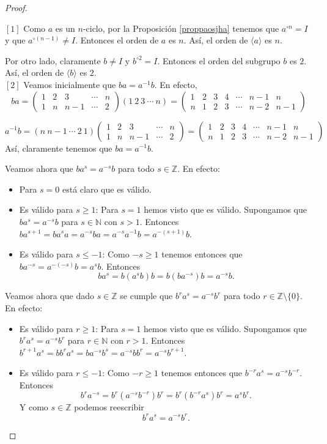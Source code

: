 \begin{proof}
	\textcolor{white}{text}
	
	\medskip
	\noindent $[1]$ Como $a$ es un $n$-ciclo, por la Proposición \ref{proppaosjha} tenemos que $a^{\circ n}=I$ y que $a^{\circ(n-1)}\neq I$. Entonces el orden de $a$ es $n$. Así, el orden de $\langle a\rangle$ es $n$. 
	
	\medskip
	\noindent Por otro lado, claramente $b\neq I$ y $b^{\circ 2}=I$. Entonces el orden del subgrupo  $b$ es $2$. Así, el orden de $\langle b\rangle$ es $2$.         \\
	
	\noindent $[2]$ Veamos inicialmente que $ba=a^{-1}b$. En efecto,  
	\[
	ba = \begin{pmatrix}
		1 & 2 & 3 & \cdots & n \\
		1 & n & n-1 & \cdots & 2
	\end{pmatrix}
	(1\ 2\ 3\ \cdots\ n) 
	= \begin{pmatrix}
		1 & 2 & 3 & 4 & \cdots & n-1 & n \\
		n & 1 & 2 & 3 & \cdots & n-2 & n-1
	\end{pmatrix}
	\]     
	
	\[
	a^{-1}b = (n\ n-1\ \cdots\ 2\ 1)\begin{pmatrix}
		1 & 2 & 3 & \cdots & n \\
		1 & n & n-1 & \cdots & 2
	\end{pmatrix} = \begin{pmatrix}
		1 & 2 & 3 & 4 & \cdots & n-1 & n \\
		n & 1 & 2 & 3 & \cdots & n-2 & n-1
	\end{pmatrix}
	\] Así, claramente tenemos que $ba=a^{-1}b$.
	
	\medskip
	\noindent Veamos ahora que $ba^{s}=a^{-s}b$ para todo $s\in \mathbb{Z}$. En efecto:
	\begin{itemize}
		\item Para $s=0$ está claro que es válido.
		\item Es válido para $s\geq 1$: Para $s=1$ hemos visto que es válido. Supongamos que $ba^s=a^{-s}b$ para $s\in \mathbb{N}$ con $s>1$. Entonces $ba^{s+1}=ba^sa=a^{-s}ba=a^{-s}a^{-1}b=a^{-(s+1)}b$.
		\item Es válido para $s\leq -1$: Como $-s\geq 1$ tenemos entonces que $ba^{-s}=a^{-(-s)}b=a^sb$. Entonces $$ba^s=b(a^sb)b=b(ba^{-s})b=a^{-s}b.$$
	\end{itemize}
	\noindent Veamos ahora que dado $s\in \mathbb{Z}$ se cumple que $b^ra^{s}=a^{-s}b^r$ para todo $r\in \mathbb{Z}\setminus\{0\}$. En efecto:
	\begin{itemize}
		\item Es válido para $r\geq 1$: Para $s=1$ hemos visto que es válido. Supongamos que $b^ra^s=a^{-s}b^r$ para $r\in \mathbb{N}$ con $r>1$. Entonces $b^{r+1}a^{s}=bb^ra^s=ba^{-s}b^s=a^{-s}bb^r=a^{-s}b^{r+1}$.
		\item Es válido para $r\leq -1$: Como $-r\geq 1$ tenemos entonces que $b^{-r}a^{s}=a^{-s}b^{-r}$. Entonces \[
		b^r a^{-s} = b^r \left( a^{-s} b^{-r} \right) b^r = b^r \left( b^{-r} a^{s}\right) b^r=a^sb^r.
		\]
		Y como $s\in \mathbb{Z}$ podemos reescribir 
		\[
		b^r a^{s} =a^{-s}b^r.
		\]
	\end{itemize}
	

\end{proof}
